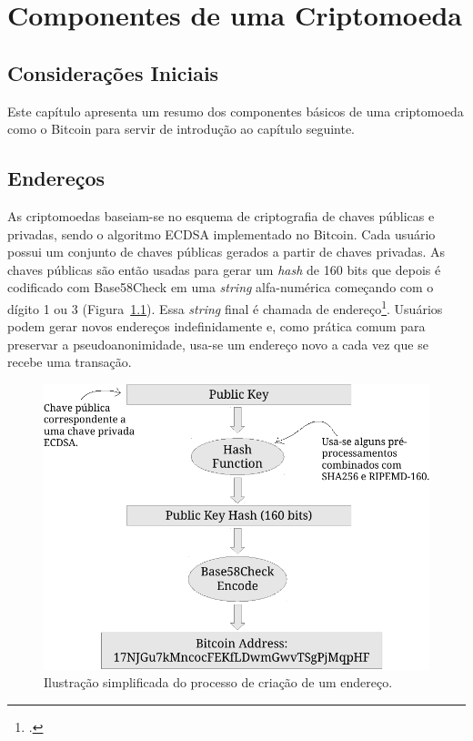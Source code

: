 \chapter{Componentes de uma Criptomoeda}
\label{ch:bitcoin-tech}

\section{Considerações Iniciais}

Este capítulo apresenta um resumo dos componentes básicos de uma criptomoeda como o Bitcoin para servir de introdução ao capítulo seguinte.

\section{Endereços}

As criptomoedas baseiam-se no esquema de criptografia de chaves públicas e privadas, sendo o algoritmo ECDSA implementado no Bitcoin. Cada usuário possui um conjunto de chaves públicas gerados a partir de chaves privadas. As chaves públicas são então usadas para gerar um \textit{hash} de 160 bits que depois é codificado com Base58Check em uma \textit{string} alfa-numérica começando com o dígito 1 ou 3 (Figura~\ref{fig:endereco}). Essa \textit{string} final é chamada de endereço\footnote{\cite[p. 71]{bib:bitcoinbook}.}. Usuários podem gerar novos endereços indefinidamente e, como prática comum para preservar a pseudoanonimidade, usa-se um endereço novo a cada vez que se recebe uma transação.

\begin{figure}[h!]
	\centering
	\includegraphics[scale=0.85]{./images/endereco.pdf}
	\caption{Ilustração simplificada do processo de criação de um endereço. \label{fig:endereco}}
\end{figure}

